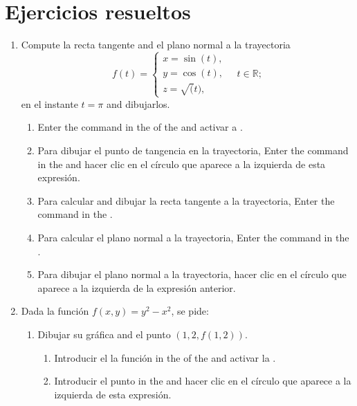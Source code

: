 \section{Ejercicios resueltos}
\begin{enumerate}[leftmargin=*]
\item Compute la recta tangente and el plano normal a la trayectoria
      \[
      f(t)=
      \begin{cases}
      x=\sin(t), \\
      y=\cos(t), \\
      z=\sqrt(t),
      \end{cases}
      \quad t\in \mathbb{R};
      \]
      en el instante $t=\pi$ and dibujarlos.

      \begin{indication}
      \begin{enumerate}
      \item Enter the command  in the  of the   and activar a .
      \item Para dibujar el punto de tangencia en la trayectoria, Enter the command  in the  and hacer clic en el círculo que aparece a la izquierda de esta expresión.
      \item Para calcular and dibujar la recta tangente a la trayectoria, Enter the command  in the .
      \item Para calcular el plano normal a la trayectoria, Enter the command  in the .
      \item Para dibujar el plano normal a la trayectoria, hacer clic en el círculo que aparece a la izquierda de la expresión anterior.
      \end{enumerate}
      \end{indication}

\item Dada la función $f(x,y)=y^2-x^2$, se pide:
      \begin{enumerate}
      \item Dibujar su gráfica and el punto $(1,2,f(1,2))$.
            \begin{indication}
            \begin{enumerate}
            \item Introducir el la función  in the  of the   and activar la .
            \item Introducir el punto  in the  and hacer clic en el círculo que aparece a la izquierda de esta expresión.
            \end{enumerate}


\end{indication}
\end{enumerate}
\end{enumerate}
